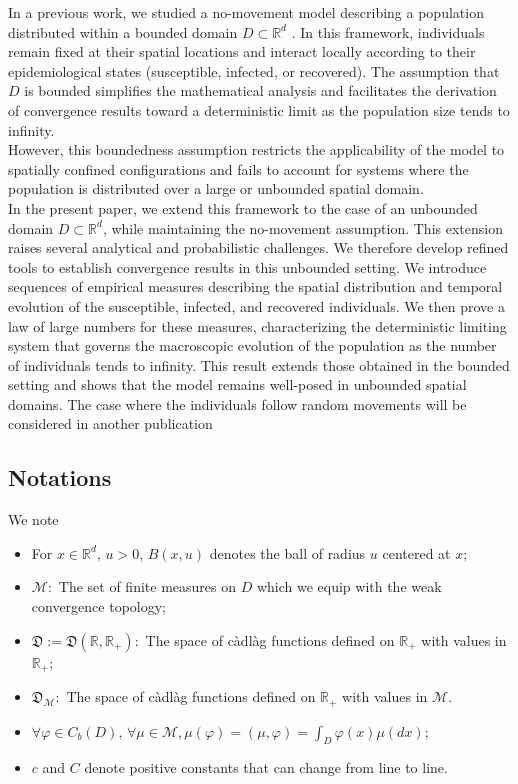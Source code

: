 \documentclass[notitlepage,reqno,11pt]{amsart}
\numberwithin{equation}{section}
\def\R{\mathbb{R}}
\begin{document}
In a previous work, we studied a no-movement model describing a population distributed within a bounded domain $D\subset \R^d$ \cite{AK-EP} . In this framework, individuals remain fixed at their spatial locations and interact locally according to their epidemiological states (susceptible, infected, or recovered). The assumption that $D$ is bounded simplifies the mathematical analysis and facilitates the derivation of convergence results toward a deterministic limit as the population size tends to infinity.\\
However, this boundedness assumption restricts the applicability of the model to spatially confined configurations and fails to account for systems where the population is distributed over a large or unbounded spatial domain.\\
In the present paper, we extend this framework to the case of an unbounded domain 
$D\subset \R^d$, while maintaining the no-movement assumption.
This extension raises several analytical and probabilistic challenges. We therefore develop refined tools to establish convergence results in this unbounded setting. We introduce sequences of empirical measures describing the spatial distribution and temporal evolution of the susceptible, infected, and recovered individuals.
We then prove a law of large numbers for these measures, characterizing the deterministic limiting system that governs the macroscopic evolution of the population as the number of individuals tends to infinity.
This result extends those obtained in the bounded setting and shows that the model remains well-posed in unbounded spatial domains.
The case where the individuals follow random movements will be considered in another publication
\subsection{Notations}
We note
\begin{itemize}
        \item[•] For $x\in\R^d$, $u>0$, $B(x,u)$ denotes the ball of radius $u$ centered at $x$;
	\item[•] $\mathcal{M}:$ The set of finite measures  on $D$ which we equip with the weak convergence topology;
	\item[•] $\mathfrak{D}:=\mathfrak{D}(\mathbb{R},\mathbb{R}_+):$ The space of càdlàg functions  defined on $\mathbb{R}_+$  with values in  $\mathbb{R}_+;$
	\item[•] $\mathfrak{D}_{\mathcal{M}}:$ The space of càdlàg functions  defined on $\mathbb{R}_+$  with values in $\mathcal{M}.$
	\item[•]$\forall \varphi \in C_b(D)$,  $\forall \mu \in \mathcal{M}, \mu(\varphi)=(\mu,\varphi)= \displaystyle \int_{D} \varphi(x) \mu(dx);$
	\item[•] $c$ and $C$ denote positive constants that can change from line to line.
\end{itemize}
\end{document}
